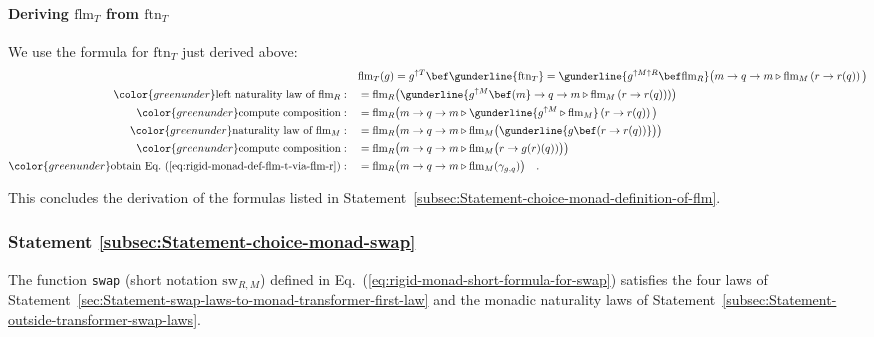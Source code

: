 \paragraph{Deriving $\text{flm}_{T}$ from $\text{ftn}_{T}$}

We use the formula for $\text{ftn}_{T}$ just derived above:
\begin{align*}
 & \text{flm}_{T}(g)=g^{\uparrow T}\bef\gunderline{\text{ftn}_{T}}=\gunderline{g^{\uparrow M\uparrow R}\bef\text{flm}_{R}}\big(m\rightarrow q\rightarrow m\triangleright\text{flm}_{M}\left(r\rightarrow r(q)\right)\big)\\
{\color{greenunder}\text{left naturality law of }\text{flm}_{R}:}\quad & =\text{flm}_{R}\big(\gunderline{g^{\uparrow M}\bef(m}\rightarrow q\rightarrow m\triangleright\text{flm}_{M}\left(r\rightarrow r(q)\right))\big)\\
{\color{greenunder}\text{compute composition}:}\quad & =\text{flm}_{R}\big(m\rightarrow q\rightarrow m\triangleright\gunderline{g^{\uparrow M}\triangleright\text{flm}_{M}}\left(r\rightarrow r(q)\right)\big)\\
{\color{greenunder}\text{naturality law of }\text{flm}_{M}:}\quad & =\text{flm}_{R}\big(m\rightarrow q\rightarrow m\triangleright\text{flm}_{M}\big(\gunderline{g\bef(r\rightarrow r(q))}\big)\big)\\
{\color{greenunder}\text{compute composition}:}\quad & =\text{flm}_{R}\big(m\rightarrow q\rightarrow m\triangleright\text{flm}_{M}\big(r\rightarrow g(r)(q))\big)\big)\\
{\color{greenunder}\text{obtain Eq.~(\ref{eq:rigid-monad-def-flm-t-via-flm-r})}:}\quad & =\text{flm}_{R}\big(m\rightarrow q\rightarrow m\triangleright\text{flm}_{M}(\gamma_{g,q})\big)\quad.
\end{align*}

This concludes the derivation of the formulas listed in Statement~\ref{subsec:Statement-choice-monad-definition-of-flm}.

\subsubsection{Statement \label{subsec:Statement-choice-monad-swap}\ref{subsec:Statement-choice-monad-swap}}

The function \lstinline!swap! (short notation $\text{sw}_{R,M}$)
defined in Eq.~(\ref{eq:rigid-monad-short-formula-for-swap}) satisfies
the four laws of Statement~\ref{sec:Statement-swap-laws-to-monad-transformer-first-law}
and the monadic naturality laws of Statement~\ref{subsec:Statement-outside-transformer-swap-laws}.

